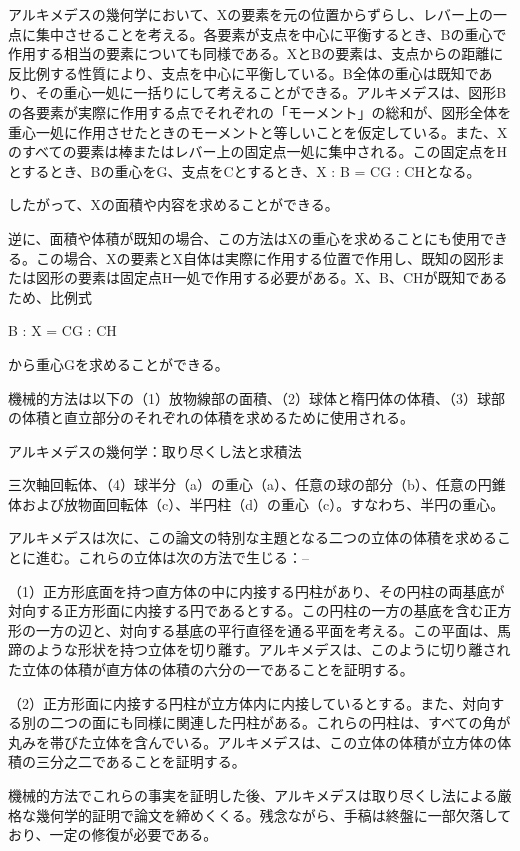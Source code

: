 \documentclass[a4paper,11pt,openany]{ltjsbook}
\begin{document}
アルキメデスの幾何学において、Xの要素を元の位置からずらし、レバー上の一点に集中させることを考える。各要素が支点を中心に平衡するとき、Bの重心で作用する相当の要素についても同様である。XとBの要素は、支点からの距離に反比例する性質により、支点を中心に平衡している。B全体の重心は既知であり、その重心一処に一括りにして考えることができる。アルキメデスは、図形Bの各要素が実際に作用する点でそれぞれの「モーメント」の総和が、図形全体を重心一処に作用させたときのモーメントと等しいことを仮定している。また、Xのすべての要素は棒またはレバー上の固定点一処に集中される。この固定点をHとするとき、Bの重心をG、支点をCとするとき、X : B = CG : CHとなる。

したがって、Xの面積や内容を求めることができる。

逆に、面積や体積が既知の場合、この方法はXの重心を求めることにも使用できる。この場合、Xの要素とX自体は実際に作用する位置で作用し、既知の図形または図形の要素は固定点H一処で作用する必要がある。X、B、CHが既知であるため、比例式

B : X = CG : CH

から重心Gを求めることができる。

機械的方法は以下の（1）放物線部の面積、（2）球体と楕円体の体積、（3）球部の体積と直立部分のそれぞれの体積を求めるために使用される。

アルキメデスの幾何学：取り尽くし法と求積法

三次軸回転体、（4）球半分（a）の重心（a）、任意の球の部分（b）、任意の円錐体および放物面回転体（c）、半円柱（d）の重心（c）。すなわち、半円の重心。

アルキメデスは次に、この論文の特別な主題となる二つの立体の体積を求めることに進む。これらの立体は次の方法で生じる：--

（1）正方形底面を持つ直方体の中に内接する円柱があり、その円柱の両基底が対向する正方形面に内接する円であるとする。この円柱の一方の基底を含む正方形の一方の辺と、対向する基底の平行直径を通る平面を考える。この平面は、馬蹄のような形状を持つ立体を切り離す。アルキメデスは、このように切り離された立体の体積が直方体の体積の六分の一であることを証明する。

（2）正方形面に内接する円柱が立方体内に内接しているとする。また、対向する別の二つの面にも同様に関連した円柱がある。これらの円柱は、すべての角が丸みを帯びた立体を含んでいる。アルキメデスは、この立体の体積が立方体の体積の三分之二であることを証明する。

機械的方法でこれらの事実を証明した後、アルキメデスは取り尽くし法による厳格な幾何学的証明で論文を締めくくる。残念ながら、手稿は終盤に一部欠落しており、一定の修復が必要である。
\end{document}
